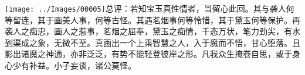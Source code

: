 {\texttt{[image: ../Images/00005]}总评：若知宝玉真性情者，当留心此回。其与袭人何等留连，其于画美人事，何等古怪。其遇茗烟事何等怜惜，其于黛玉何等保护。再袭人之痴忠，画人之惹事，茗烟之屈奉，黛玉之痴情，千态万状，笔力劲尖，有水到渠成之象，无微不至。真画出一个上乘智慧之人，入于魔而不悟，甘心堕落。且影出诸魔之神通，亦非泛泛，有势不能轻登彼岸之形。凡我众生掩卷自思，或于身心少有补益。小子妄谈，诸公莫怪。}

%
%
%
%
%
